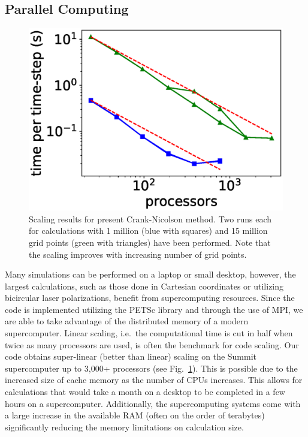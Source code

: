 \subsection{Parallel Computing} %
\label{sub:parallel_computing}
\begin{figure}[!ht]
\centering
\includegraphics[width=0.5\columnwidth]{figs/Rydberg/multi_node.eps}
\caption{\label{fig:scaling} Scaling results for present Crank-Nicolson method. Two runs each for calculations with 1 million (blue with squares) and 15 million grid points (green with triangles) have been performed. Note that the scaling improves with increasing number of grid points.
}
\end{figure}
Many simulations can be performed on a laptop or small desktop, however, the largest calculations, such as those done in Cartesian coordinates or utilizing bicircular laser polarizations, benefit from supercomputing resources. Since the code is implemented utilizing the PETSc library and through the use of MPI, we are able to take advantage of the distributed memory of a modern supercomputer. Linear scaling, i.e.\ the computational time is cut in half when twice as many processors are used, is often the benchmark for code scaling. Our code obtains super-linear (better than linear) scaling on the Summit supercomputer up to 3,000+ processors (see Fig.~\ref{fig:scaling}). This is possible due to the increased size of cache memory as the number of CPUs increases. This allows for calculations that would take a month on a desktop to be completed in a few hours on a supercomputer. Additionally, the supercomputing systems come with a large increase in the available RAM (often on the order of terabytes) significantly reducing the memory limitations on calculation size.





